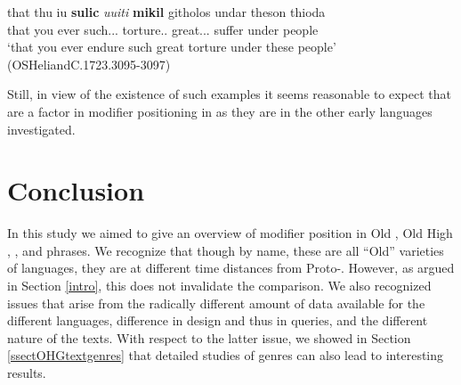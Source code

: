 \documentclass[output=paper,colorlinks,citecolor=brown,draft]{langscibook}
\begin{document}
\ea\label{OSFlanksuch}
\gll that thu iu \textbf{sulic} \textit{uuiti} \textbf{mikil} githolos undar theson thioda\\
that you ever such.\ACC.\SG.\STR{} torture.\ACC.\SG{} great.\ACC.\SG.\STR{} suffer under \DEM{} people\\
\glt ‘that you ever endure such great torture under these people’ (OSHeliandC.1723.3095-3097)
\z

Still, in view of the existence of such examples it seems reasonable to expect that  are a factor in modifier positioning in  as they are in the other early  languages investigated.

\section{Conclusion}\label{sectconc}

 In this study we aimed to give an overview of modifier position in Old , Old High , , and   phrases. We recognize that though by name, these are all ``Old'' varieties of  languages, they are at different time distances from Proto-. However, as argued in Section \ref{intro}, this does not invalidate the comparison. We also recognized issues that arise from the radically different amount of data available for the different languages, difference in  design and thus in queries, and the different nature of the texts. With respect to the latter issue, we showed in Section \ref{ssectOHGtextgenres} that detailed studies of genres can also lead to interesting results.
 
\end{document}
